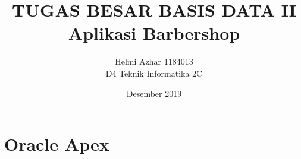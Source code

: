 ﻿\documentclass{article}
\title{TUGAS BESAR BASIS DATA II\\
Aplikasi Barbershop}
\author{Helmi Azhar 1184013\\
D4 Teknik Informatika 2C}
\date{Desember 2019}
\begin{document}
\maketitle
\section{Oracle Apex}

\begin{enumerate}
\usepackage{Oracle Apex merupakan suatu aplikasi atau tools  untuk memudahkan apa yang kita butuhkan. Sesuai namanya, oracle express bila dipelajari lebih dalam banyak memberi kemudahan dalam melayanani kebutuhan user contohnya dalam pembuatan aplikasi sederhana,belajar function dan lain-lain. Oracle apex juga dapat mengembangkan aplikasi web desktop dan seluler, memvisualisasikan dan memelihara data basis data, dan meningkatkan keterampilan sql dan kemampuan basis data}
\end{enumerate}
\end{document}

